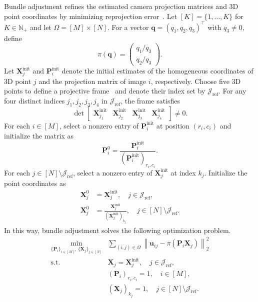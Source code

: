 \documentclass[11pt,a4paper]{article}
\begin{document}
Bundle adjustment refines the estimated camera projection matrices and 3D point coordinates by minimizing reprojection error~\cite{triggs2000bundle}. Let \([K] = \{1, \dots, K\}\) for \(K \in \mathbb{N}_{+}\) and let \(\Omega = [M] \times [N]\). For a vector \(\mathbf q = (q_1, q_2, q_3)^\top\) with \(q_3 \neq 0\), define
\begin{equation}\label{eq:pi}
  \pi(\mathbf q) = \begin{pmatrix} q_1/q_3\\ q_2/q_3 \end{pmatrix}.
\end{equation}
Let \(\mathbf X_j^\text{init}\) and \(\mathbf P_i^\text{init}\) denote the initial estimates of the homogeneous coordinates of 3D point \(j\) and the projection matrix of image \(i\), respectively. Choose five 3D points to define a projective frame~\cite{mohr1994projective} and denote their index set by \(\mathcal{J}_{\text{ref}}\). For any four distinct indices \(j_1,j_2,j_3,j_4\) in \(\mathcal{J}_{\text{ref}}\), the frame satisfies
\begin{equation}
  \det\!\begin{bmatrix}
    \mathbf X_{j_1}^\text{init} & \mathbf X_{j_2}^\text{init} & \mathbf X_{j_3}^\text{init} & \mathbf X_{j_4}^\text{init}
  \end{bmatrix} \ne 0.
\end{equation}
For each \(i \in [M]\), select a nonzero entry of \(\mathbf P_i^\text{init}\) at position \((r_i, c_i)\) and initialize the matrix as
\begin{equation}
  \mathbf P_i^0 = \frac{\mathbf P_i^\text{init}}{(\mathbf P_i^\text{init})_{r_i,c_i}}.
\end{equation}
For each \(j \in [N] \setminus \mathcal{J}_{\text{ref}}\), select a nonzero entry of \(\mathbf X_j^\text{init}\) at index \(k_j\). Initialize the point coordinates as
\begin{equation}
  \begin{aligned}
    \mathbf X_j^0 &= \mathbf X_j^\text{init}, \quad j \in \mathcal{J}_{\text{ref}}, \\
    \mathbf X_j^0 &= \frac{\mathbf X_j^\text{init}}{(\mathbf X_j^\text{init})_{k_j}}, \quad j \in [N] \setminus \mathcal{J}_{\text{ref}}.
  \end{aligned}
\end{equation}
In this way, bundle adjustment solves the following optimization problem.
\begin{equation}\label{eq:bundle-adjustment}
  \begin{aligned}
    \min_{\{\mathbf P_i\}_{i\in[M]},\,\{\mathbf X_j\}_{j\in[N]}} &\sum_{(i,j)\in\Omega} \left\|\mathbf u_{ij}-\pi\!\left(\mathbf P_i \mathbf X_j\right)\right\|_2^2 \\
    \text{s.t.} \quad & \mathbf X_j = \mathbf X_j^\text{init}, \quad j \in \mathcal{J}_{\text{ref}}, \\
  & (\mathbf P_i)_{r_i,c_i} = 1, \quad i \in [M], \\
  & (\mathbf X_j)_{k_j} = 1, \quad j \in [N] \setminus \mathcal{J}_{\text{ref}}.
  \end{aligned}
\end{equation}
\end{document}
